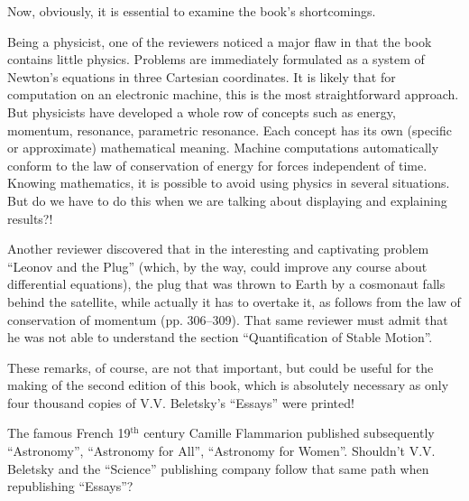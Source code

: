 \documentclass[12pt]{amsart}
\begin{document}
Now, obviously, it is essential to examine the book's shortcomings.

Being a physicist, one of the reviewers noticed a major flaw in that the book
contains little physics.
Problems are immediately formulated as a system of Newton's equations in three
Cartesian coordinates.
It is likely that for computation on an electronic machine, this is the most
straightforward approach.
But physicists have developed a whole row of concepts such as energy, momentum,
resonance, parametric resonance.
Each concept has its own (specific or approximate) mathematical meaning.
Machine computations automatically conform to the law of conservation of energy
for forces independent of time.
Knowing mathematics, it is possible to avoid using physics in several
situations.
But do we have to do this when we are talking about displaying and explaining
results?!

Another reviewer discovered that in the interesting and captivating problem
``Leonov and the Plug'' (which, by the way, could improve any course about
differential equations), the plug that was thrown to Earth by a cosmonaut falls
behind the satellite, while actually it has to overtake it, as follows from the
law of conservation of momentum (pp. 306--309).
That same reviewer must admit that he was not able to understand the section
``Quantification of Stable Motion''.

These remarks, of course, are not that important, but could be useful for the
making of the second edition of this book, which is absolutely necessary as only
four thousand copies of V.V. Beletsky's ``Essays'' were printed!

The famous French 19$^\text{th}$ century Camille Flammarion published
subsequently ``Astronomy'', ``Astronomy for All'', ``Astronomy for Women''.
Shouldn't V.V. Beletsky and the ``Science'' publishing company follow that same
path when republishing ``Essays''?
\end{document}
